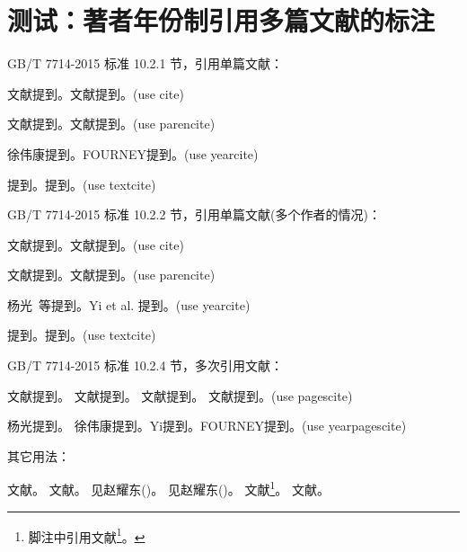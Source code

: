 \documentclass[twoside]{article}
\begin{document}
    \section{测试：著者年份制引用多篇文献的标注}
    \begin{refsection}
        GB/T 7714-2015 标准 10.2.1 节，引用单篇文献：

    文献\cite{徐伟康2010对}提到。文献\cite{FOURNEY1971-17-38}提到。(use cite)\par
    文献\parencite{徐伟康2010对}提到。文献\parencite{FOURNEY1971-17-38}提到。(use parencite)\par
    徐伟康提到。FOURNEY提到。(use yearcite)\par
    \textcite{徐伟康2010对}提到。\textcite{FOURNEY1971-17-38}提到。(use textcite)\par

\bigskip
    GB/T 7714-2015 标准 10.2.2 节，引用单篇文献(多个作者的情况)：

    文献\cite{杨光2015经济波动}提到。文献\cite{Yi2013--}提到。(use cite)\par
    文献\parencite{杨光2015经济波动}提到。文献\parencite{Yi2013--}提到。(use parencite)\par
    杨光\ 等提到。Yi et al. 提到。(use yearcite)\par
    \textcite{杨光2015经济波动}提到。\textcite{Yi2013--}提到。(use textcite)\par


\bigskip
    GB/T 7714-2015 标准 10.2.4 节，多次引用文献：

    文献提到。
    文献提到。
    文献提到。
    文献提到。(use pagescite)\par
    杨光提到。
    徐伟康提到。Yi提到。FOURNEY提到。(use yearpagescite)\par

\bigskip
    其它用法：

    文献\cite[见][49页]{杨光2015经济波动}。
    文献\parencite[见][49页]{杨光2015经济波动}。
    见赵耀东(\cite*{杨光2015经济波动})。
    见赵耀东(\citeyear{杨光2015经济波动})。
    文献\footnote{脚注中引用文献\footcite{杨光2015经济波动}。}。
    文献。


    \printbibliography
    \end{refsection}
\end{document}
